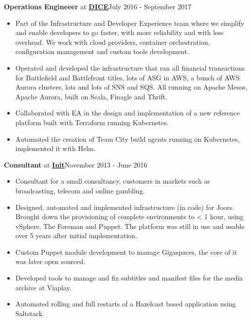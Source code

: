 \documentclass[10pt,sans]{moderncv}
\newenvironment{outerlist}[1][\enskip\textbullet]%
        {\begin{itemize}[#1]}{\end{itemize}%
         \vspace{-.6\baselineskip}}
\newcommand{\blankline}{\quad\pagebreak[2]}
\begin{document}
\textbf{Operations Engineeer} at \href{http://www.dice.se}{\textbf{DICE}}\hfill {July 2016 - September 2017}
\begin{outerlist}
\item[] Part of the Infrastructure and Developer Experience team where we simplify and enable developers to go faster, with more reliability and with less overhead. We work with cloud providers, container orchestration, configuration management and custom tools development.

\item Operated and developed the infrastructure that ran all financial transactions for Battlefield and Battlefront titles, lots of ASG in AWS, a bunch of AWS Aurora clusters, lots and lots of SNS and SQS. All running on Apache Mesos, Apache Aurora, built on Scala, Finagle and Thrift.
\item Collaborated with EA in the design and implementation of a new reference platform built with Terraform running Kubernetes. 
\item Automated the creation of Team City build agents running on Kubernetes, implemented it with Helm.
\end{outerlist}
\blankline

\textbf{Consultant} at \href{http://www.init.se}{\textbf{Init}}\hfill {November 2013 - June 2016}
\begin{outerlist}
\item[] Consultant for a small consultancy, customers in markets such as broadcasting, telecom and online gambling.

	\item Designed, automated and implemented infrastructure (in code) for Joors. Brought down the provisioning of complete environments to < 1 hour,
		using vSphere, The Foreman and Puppet. The platform was still in use and usable over 5 years after initial implementation.
	\item Custom Puppet module development to manage Gigaspaces, the core of it was later open sourced.
	\item Developed tools to manage and fix subtitles and manifest files for the media archive at Viaplay.
	\item Automated rolling and full restarts of a Hazelcast based application using Saltstack.
\end{outerlist}
\blankline
\end{document}
